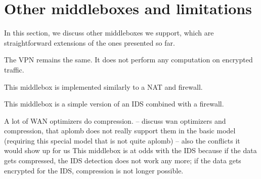 
\section{Other middleboxes and limitations}\label{sec:vpn} \label{sec:other_apps} \label{sec:not_supp}\label{sec:loadb}

In this section, we discuss other middleboxes we support, which are straightforward extensions of the ones presented so far. 

 

 The VPN remains the same. It does not perform any computation on encrypted traffic. 

 This middlebox is implemented similarly to a NAT and firewall. 

 This middlebox is a simple version of an IDS combined with a firewall. 



 A lot of WAN optimizers do compression. 
-- discuss wan optimizers and compression, that aplomb does not really support them in the basic model (requiring this special model that is not quite aplomb) -- also the conflicts it would show up for us
This middlebox is at odds with the IDS because if the data gets compressed, the IDS detection does not work any more; if the data gets encrypted for the IDS, compression is not longer possible. 
